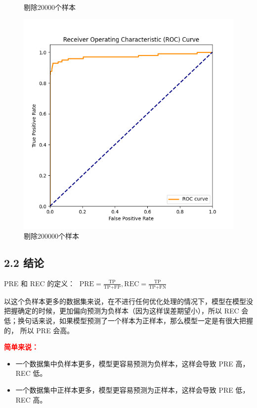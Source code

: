 \documentclass[8pt]{article}
\begin{document}
\begin{figure}[H]
\begin{minipage}{0.32\textwidth}
        \caption{剔除20000个样本}
        \label{fig:roc_curve_remove20000}
    \end{minipage}
    \hfill
    \begin{minipage}{0.32\textwidth}
        \centering
        \includegraphics[width=\textwidth]{../Prob1/out/rand_seed_14/task2/roc_curve_remove200000.png}
        \caption{剔除200000个样本}
        \label{fig:roc_curve_remove200000}
    \end{minipage}
    \hfill
\end{figure}

\subsection*{2.2 结论}

PRE 和 REC 的定义：
\(      \text{ \ \ PRE} = \frac{\text{TP}}{\text{TP+FP}}, 
        \text{REC} = \frac{\text{TP}}{\text{TP+FN}}
\)

以这个负样本更多的数据集来说，在不进行任何优化处理的情况下，模型在模型没把握确定的时候，更加偏向预测为负样本（因为这样误差期望小），所以 REC 会低；换句话来说，如果模型预测了一个样本为正样本，那么模型一定是有很大把握的， 所以 PRE 会高。

\textbf{\textcolor{red}{简单来说：}}
\begin{itemize}
    \item 一个数据集中负样本更多，模型更容易预测为负样本，这样会导致 PRE 高，REC 低。
    \item 一个数据集中正样本更多，模型更容易预测为正样本，这样会导致 PRE 低，REC 高。
\end{itemize}
\end{document}
